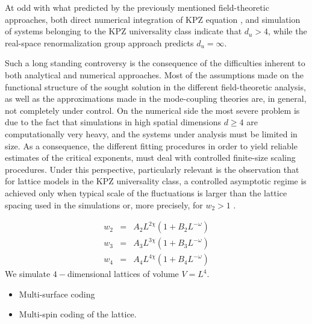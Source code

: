 \documentclass[prl,showpacs,amssymb,floatfix]{revtex4-1}
\begin{document}
At odd with what predicted by the previously mentioned field-theoretic
approaches, both direct numerical integration of KPZ equation
\cite{Moser1991}, and simulation of systems belonging to the KPZ
universality class \cite{ KK1989,
  *WK1987,*TLFWD1992,*Nissila1993,NOIKPZ2001,*NOIKPZ2002,Perlsman-Havlin2006,
  *Schwartz-Perlsman2011,KellingOrdor2011} indicate that $d_u > 4$,
while the real-space renormalization group approach \cite{ CMP1998,
  *CGMMP1998,*CMMP1999} predicts $d_u = \infty$.

Such a long standing controversy is the consequence of the
difficulties inherent to both analytical and numerical
approaches. Most of the assumptions made on the functional structure
of the sought solution in the different field-theoretic analysis, as
well as the approximations made in the mode-coupling theories are, in
general, not completely under control. On the numerical side the most
severe problem is due to the fact that simulations in high spatial
dimensions $d \geq 4$ are computationally very heavy, and the systems
under analysis must be limited in size. As a consequence, the
different fitting procedures in order to yield reliable estimates of
the critical exponents, must deal with controlled finite-size scaling
procedures. Under this perspective, particularly relevant is the
observation that for lattice models in the KPZ universality class, a
controlled asymptotic regime is achieved only when typical scale of
the fluctuations is larger than the lattice spacing used in the
simulations or, more precisely, for $w_2 > 1$
\cite{ColaioriMoore2001}.

\begin{eqnarray}
\label{eq:fit}
w_2  &=& A_2 L^{2\chi}( 1 + B_2 L^{-\omega})\nonumber\\
w_3  &=& A_3 L^{3\chi}( 1 + B_3 L^{-\omega})\\
w_4  &=& A_4 L^{4\chi}( 1 + B_4 L^{-\omega})\nonumber
\end{eqnarray}
We simulate $4-$dimensional lattices of volume $V = L^4$. 



\begin{itemize}
\item Multi-surface coding
\item Multi-spin coding of the lattice.
\end{itemize}
\end{document}
